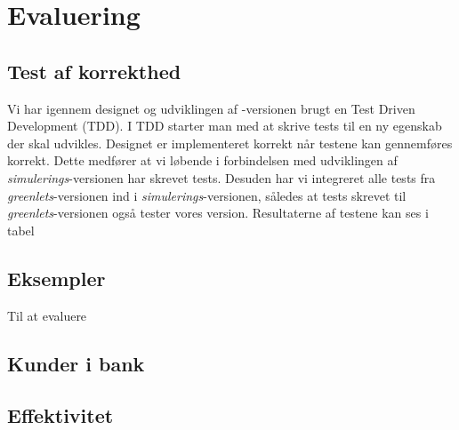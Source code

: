 \section{Evaluering}
\subsection{Test af korrekthed}
  Vi har igennem designet og udviklingen af -versionen brugt en Test Driven Development (TDD). I TDD starter man med at skrive tests til en ny egenskab der skal udvikles. Designet er implementeret korrekt når testene kan gennemføres korrekt. Dette medfører at vi løbende i forbindelsen med udviklingen af \emph{simulerings}-versionen har skrevet tests. Desuden har vi integreret alle tests fra \emph{greenlets}-versionen ind i \emph{simulerings}-versionen, således at tests skrevet til \emph{greenlets}-versionen også tester vores version. Resultaterne af testene kan ses i tabel 
  
\subsection{Eksempler}
Til at evaluere 
\subsection{Kunder i bank}




\subsection{Effektivitet}  
  

